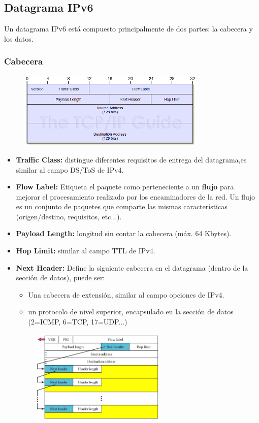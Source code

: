 \subsection{Datagrama IPv6}
Un datagrama IPv6 está compuesto principalmente de dos partes: la cabecera y los datos.
\subsubsection{Cabecera}
\begin{figure}[H]
    \centering \includegraphics[width=0.8\textwidth]{img/ipv6_HEADER.png}
\end{figure}
\begin{itemize}
    \item \textbf{Traffic Class: }distingue diferentes requisitos de entrega del datagrama,es similar al campo DS/ToS de IPv4.
    \item \textbf{Flow Label: }Etiqueta el paquete como perteneciente a un \textbf{flujo} para mejorar el procesamiento realizado por los encaminadores de la red. Un flujo es un conjunto de paquetes que comparte las mismas características (origen/destino, requisitos, etc...).
    \item \textbf{Payload Length: }longitud sin contar la cabecera (máx. 64 Kbytes).
    \item \textbf{Hop Limit: }similar al campo TTL de IPv4.
    \item \textbf{Next Header: }Define la siguiente cabecera en el datagrama (dentro de la sección de datos), puede ser: 
    \begin{itemize}
        \item Una cabecera de extensión, similar al campo opciones de IPv4.
        \item un protocolo de nivel superior, encapsulado en la sección de datos (2=ICMP, 6=TCP, 17=UDP...)
    \end{itemize}
    \begin{figure}[H]
    \centering \includegraphics[width=0.6\textwidth]{img/IPv6_nextHeader.png}
\end{figure}
\end{itemize}

